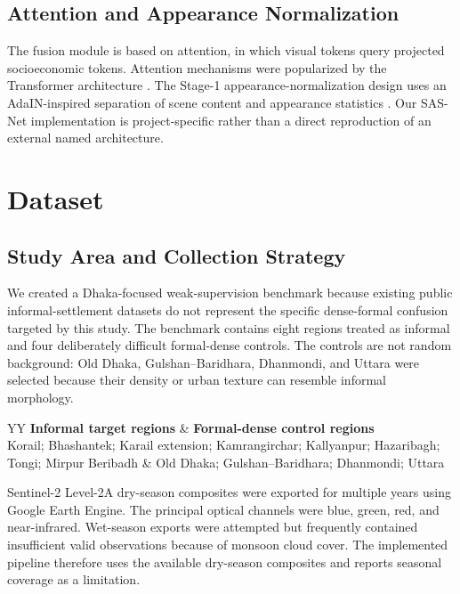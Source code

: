 \documentclass[11pt,a4paper]{article}
\begin{document}
\subsection{Attention and Appearance Normalization}

The fusion module is based on attention, in which visual tokens query projected socioeconomic tokens. Attention mechanisms were popularized by the Transformer architecture \citep{vaswani2017attention}. The Stage-1 appearance-normalization design uses an AdaIN-inspired separation of scene content and appearance statistics \citep{huang2017adain}. Our SAS-Net implementation is project-specific rather than a direct reproduction of an external named architecture.

\section{Dataset}

\subsection{Study Area and Collection Strategy}

We created a Dhaka-focused weak-supervision benchmark because existing public informal-settlement datasets do not represent the specific dense-formal confusion targeted by this study. The benchmark contains eight regions treated as informal and four deliberately difficult formal-dense controls. The controls are not random background: Old Dhaka, Gulshan--Baridhara, Dhanmondi, and Uttara were selected because their density or urban texture can resemble informal morphology.

\begin{table}[H]
\centering
\caption{Region groups used in the benchmark.}
\begin{tabularx}{\linewidth}{YY}
\toprule
\textbf{Informal target regions} & \textbf{Formal-dense control regions}\\
\midrule
Korail; Bhashantek; Karail extension; Kamrangirchar; Kallyanpur; Hazaribagh; Tongi; Mirpur Beribadh
&
Old Dhaka; Gulshan--Baridhara; Dhanmondi; Uttara\\
\bottomrule
\end{tabularx}
\end{table}

Sentinel-2 Level-2A dry-season composites were exported for multiple years using Google Earth Engine. The principal optical channels were blue, green, red, and near-infrared. Wet-season exports were attempted but frequently contained insufficient valid observations because of monsoon cloud cover. The implemented pipeline therefore uses the available dry-season composites and reports seasonal coverage as a limitation.
\end{document}
